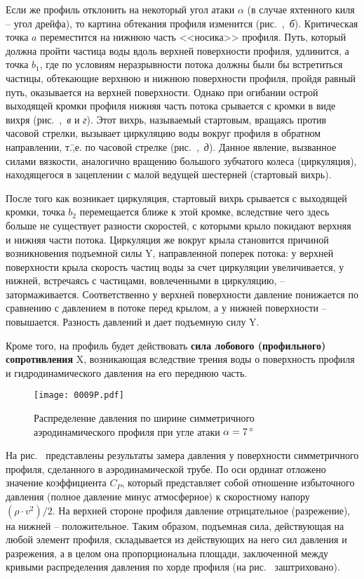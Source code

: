Если же профиль отклонить на некоторый угол атаки $\alpha$ (в случае
яхтенного киля \--- угол дрейфа), то картина обтекания профиля
изменится (рис.~,~\textit{б}). Критическая точка $a$
переместится на нижнюю часть <<носика>> профиля. Путь, который должна
пройти частица воды вдоль верхней поверхности профиля, удлинится, а
точка $b_1$, где по условиям неразрывности потока должны были бы
встретиться частицы, обтекающие верхнюю и нижнюю поверхности профиля,
пройдя равный путь, оказывается на верхней поверхности. Однако при
огибании острой выходящей кромки профиля нижняя часть потока срывается
с кромки в виде вихря (рис.~,~\textit{в} и \textit{г}). Этот
вихрь, называемый стартовым, вращаясь против часовой стрелки, вызывает
циркуляцию воды вокруг профиля в обратном направлении, т.\=,е. по
часовой стрелке (рис.~,~\textit{д}). Данное явление, вызванное
силами вязкости, аналогично вращению большого зубчатого колеса
(циркуляция), находящегося в зацеплении с малой ведущей шестерней
(стартовый вихрь).

После того как возникает циркуляция, стартовый вихрь срывается с
выходящей кромки, точка $b_2$ перемещается ближе к этой кромке,
вследствие чего здесь больше не существует разности скоростей, с
которыми крыло покидают верхняя и нижняя части потока. Циркуляция же
вокруг крыла становится причиной возникновения подъемной силы \ve Y,
направленной поперек потока: у верхней поверхности крыла скорость
частиц воды за счет циркуляции увеличивается, у нижней, встречаясь с
частицами, вовлеченными в циркуляцию, \---
затормаживается. Соответственно у верхней поверхности давление
понижается по сравнению с давлением в потоке перед крылом, а у нижней
поверхности \--- повышается. Разность давлений и дает подъемную силу
\ve Y.

Кроме того, на профиль будет действовать \textbf{сила лобового (профильного) сопротивления}
\ve X, возникающая вследствие трения
воды о поверхность профиля и гидродинамического давления на его
переднюю часть.

\begin{figure}[htb]
  \centering
  \texttt{[image: 0009P.pdf]}
  \caption{Распределение давления по ширине симметричного аэродинамического профиля при угле атаки $\alpha = 7\,^\circ$}
  \label{fig:9}
\end{figure}

На рис.~ представлены результаты замера давления у поверхности
симметричного профиля, сделанного в аэродинамической трубе. По оси
ординат отложено значение коэффициента $C_P$, который представляет
собой отношение избыточного давления (полное давление минус
атмосферное) к скоростному напору $(\rho \cdot v^2) / 2$. На верхней
стороне профиля давление отрицательное (разрежение), на нижней \---
положительное. Таким образом, подъемная сила, действующая на любой
элемент профиля, складывается из действующих на него сил давления и
разрежения, а в целом она пропорциональна площади, заключенной между
кривыми распределения давления по хорде профиля (на рис.~
заштриховано).

